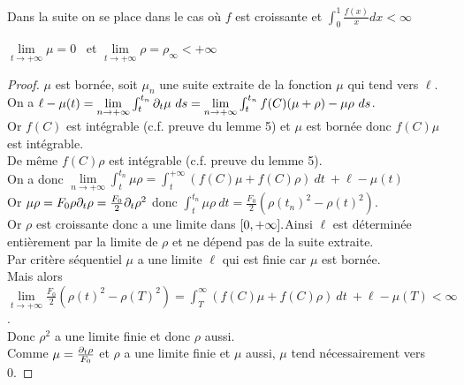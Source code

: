 \documentclass[11pt]{article}
\begin{document}
Dans la suite on se place dans le cas où $f$ est croissante et   $\int_0^1 \frac{f(x)}{x} dx < \infty $
\begin{lemma} $\underset{t\to+\infty} \lim \mu = 0$ \  et $\underset{t\to+\infty} \lim \rho =\rho_\infty < +\infty $ \end{lemma}
\begin{proof}
$\mu$ est bornée, soit $\mu_n$ une suite extraite de la fonction $\mu$ qui tend vers $\ell$.\\
On a $ \ell- \mu(t) = \underset{n\to+\infty} \lim \int_t^{t_n}\partial_t \mu \ ds = \underset{n\to+\infty} \lim \int_t^{t_n} f(C)(\mu+\rho)-\mu\rho \ ds$.\\
Or $f(C)$ est intégrable (c.f. preuve du lemme 5) et $\mu$ est bornée donc $f(C)\mu$ est intégrable.\\
De même $ f(C)\rho$ est intégrable (c.f. preuve du lemme 5).\\
On a donc $\underset{n\to+\infty} \lim \int_t^{t_n} \mu\rho =  \int_t^{+\infty}(f(C)\mu + f(C)\rho) \ dt \ + \ell -\mu(t) $\\
Or $\mu\rho= F_0\rho\partial_t\rho = \frac{F_0}{2}\partial_t \rho ^2$ donc $\int_t^{t_n} \mu\rho \ dt= \frac{F_0}{2}( \rho(t_n) ^2 -\rho(t)^2)$. \\
Or $\rho$ est croissante donc a une limite dans $[0,+\infty]. \\
$Ainsi $\ell$ est déterminée entièrement par la limite de $\rho$ et ne dépend pas de la suite extraite.\\
Par critère séquentiel $\mu$ a une limite $\ell$ qui est finie car $\mu$ est bornée.\\
Mais alors  $\underset{t\to+\infty} \lim \frac{F_0}{2}( \rho(t) ^2 -\rho(T)^2) = \int_T^{\infty}(f(C)\mu + f(C)\rho) \ dt \ + \ell -\mu(T) < \infty$.\\
Donc $\rho^2$ a une limite finie et donc $\rho$ aussi.\\
Comme $\mu = \frac{\partial_t \rho}{F_0}$ et $\rho$ a une limite finie et $\mu$ aussi, $\mu$ tend nécessairement vers 0. 	 
\end{proof}


\ifdefined\COMPLETE
\else
\end{document}
